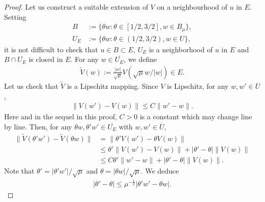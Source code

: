 \documentclass[10pt,a4paper]{article}
\theoremstyle{definition} \theoremstyle{remark}
\numberwithin{equation}{section}
\begin{document}
\begin{proof}
	
	Let us construct a suitable extension of $V$ on a neighbourhood of $u$ in $E$. Setting
	\begin{align*}
		B & := \bigl\{\theta w: \theta \in [1/2,3/2], w \in B_\mu\bigr\}, \\
		U_E & := \bigl\{\theta w: \theta \in (1/2,3/2), w \in U\bigr\},
	\end{align*}
    it is not difficult to check that $u \in B \subset E$, $U_E$ is a neighborhood of $u$ in $E$ and $B \cap \overline{U_E}$ is closed in $E$. For any $w \in \overline{U_E}$, we define
    \begin{align*}
    	\widetilde V(w) := \frac{|w|}{\sqrt \mu}V(\sqrt \mu w/|w|) \in E.
    \end{align*}
    Let us check that $\widetilde{V}$ is a Lipschitz mapping. Since $V$ is Lipschitz, for any $w, w' \in \overline{U}$,
    \begin{align*}
    	\|V(w')-V(w)\| \leq C\|w'-w\|.
    \end{align*}
    Here and in the sequel in this proof, $C > 0$ is a constant which may change line by line. Then, for any $\theta w, \theta'w' \in \overline{U_E}$ with $w, w' \in \overline{U}$,
    \begin{align*}
    	\|\widetilde{V}(\theta'w') - \widetilde{V}(\theta w)\| &
    	= \|\theta'V(w') - \theta V(w)\| \\
    	& \leq \theta'\|V(w')-V(w)\| + |\theta'-\theta|\|V(w)\| \\
    	& \leq C\theta'\|w'-w\| + |\theta'-\theta |\|V(w)\|. 
    \end{align*}
    Note that $\theta' = |\theta'w'|/\sqrt{\mu}$ and $\theta  = |\theta w|/\sqrt{\mu}$. We deduce
    \begin{align*}
    	|\theta'-\theta| \leq \mu^{-\frac12}|\theta'w'-\theta w|.
    \end{align*}

\end{proof}
\end{document}
